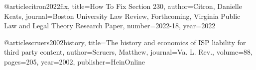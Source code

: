 @article{citron2022fix,
  title={How To Fix Section 230},
  author={Citron, Danielle Keats},
  journal={Boston University Law Review, Forthcoming, Virginia Public Law and Legal Theory Research Paper},
  number={2022-18},
  year={2022}
}

@article{scruers2002history,
  title={The history and economics of ISP liability for third party content},
  author={Scruers, Matthew},
  journal={Va. L. Rev.},
  volume={88},
  pages={205},
  year={2002},
  publisher={HeinOnline}
}

















